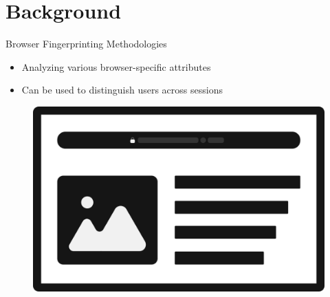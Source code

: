 \documentclass[aspectratio=169]{beamer}
[aspectratio=169] %
\begin{document}
\section{Background}

\begin{frame}{Browser Fingerprinting Methodologies}
  \begin{minipage}{0.49\textwidth} 
    \begin{itemize}
      \item Analyzing various browser-specific attributes
      \item Can be used to distinguish users across sessions
    \end{itemize}
  \end{minipage}
  \hfill
  \begin{minipage}{0.49\textwidth} 
    \begin{figure}
      \centering
      \includegraphics[height=0.5\textheight]{figures/browser.png}
    \end{figure}
  \end{minipage}
\end{frame}
\end{document}
